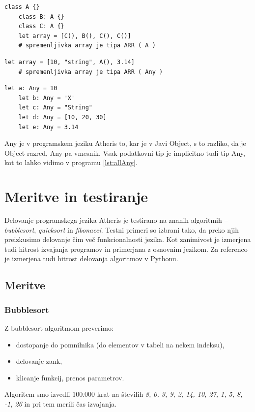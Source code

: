 \documentclass[a4paper, 12p]{book}
\begin{document}
\begin{lstlisting}[caption={Elementi tabele s skupnim nadrazredom.}, captionpos=b, label={lst:arrayCommon}]
	class A {}
	class B: A {}
	class C: A {}
	let array = [C(), B(), C(), C()] 
	# spremenljivka array je tipa ARR ( A )
\end{lstlisting}

\begin{lstlisting}[caption={Elementi tabele nimajo skupnega tipa.}, captionpos=b, label={lst:arrayNoCommon}]
	let array = [10, "string", A(), 3.14] 
	# spremenljivka array je tipa ARR ( Any )
\end{lstlisting}

\begin{lstlisting}[caption={Spremenljivkam tipa \textit{Any} lahko priredimo vrednost poljubnega tipa.}, captionpos=b, label={lst:allAny}]
	let a: Any = 10
	let b: Any = 'X'
	let c: Any = "String"
	let d: Any = [10, 20, 30]
	let e: Any = 3.14
\end{lstlisting}
%
{\ttfamily Any} je v programskem jeziku Atheris to, kar je v Javi {\ttfamily Object}, s to razliko, da je {\ttfamily Object} razred, {\ttfamily Any} pa vmesnik. Vsak podatkovni tip je implicitno tudi tip {\ttfamily Any}, kot to lahko vidimo v programu \ref{lst:allAny}.

\chapter{Meritve in testiranje}

Delovanje programskega jezika Atheris je testirano na znanih algoritmih – \textit{bubblesort}, \textit{quicksort} in \textit{fibonacci}. Testni primeri so izbrani tako, da preko njih preizkusimo delovanje čim več funkcionalnosti jezika. Kot zanimivost je izmerjena tudi hitrost izvajanja programov in primerjana z osnovnim jezikom. Za referenco je izmerjena tudi hitrost delovanja algoritmov v Pythonu.


\section{Meritve}

\subsection{Bubblesort}

Z bubblesort algoritmom preverimo:

\begin{itemize}
	\item dostopanje do pomnilnika (do elementov v tabeli na nekem indeksu),
	\item delovanje zank,
	\item klicanje funkcij, prenos parametrov.
\end{itemize}
Algoritem smo izvedli 100.000-krat na številih \textit{8, 0, 3, 9, 2, 14, 10, 27, 1, 5, 8, -1, 26} in pri tem merili čas izvajanja.
\end{document}
